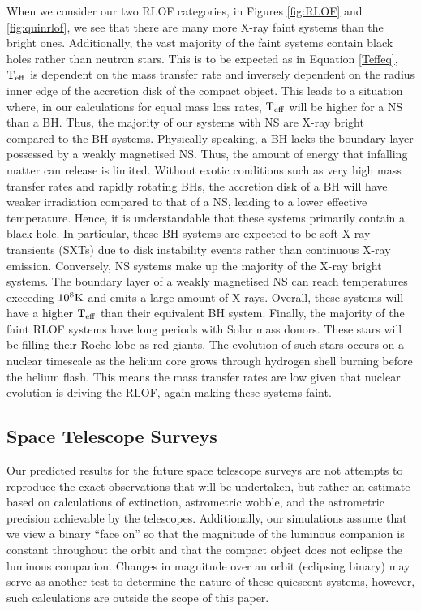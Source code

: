 \documentclass{pas}
\begin{document}
When we consider our two RLOF categories, in Figures \ref{fig:RLOF} and \ref{fig:quinrlof}, we see that there are many more X-ray faint systems than the bright ones. Additionally, the vast majority of the faint systems contain black holes rather than neutron stars. This is to be expected as in Equation \ref{Teffeq}, $\rm{T_{eff}}$ is dependent on the mass transfer rate and inversely dependent on the radius inner edge of the accretion disk of the compact object. This leads to a situation where, in our calculations for equal mass loss rates, $\rm{T_{eff}}$ will be higher for a NS than a BH. Thus, the majority of our systems with NS are X-ray bright compared to the BH systems. Physically speaking, a BH lacks the boundary layer possessed by a weakly magnetised NS. Thus, the amount of energy that infalling matter can release is limited. Without exotic conditions such as very high mass transfer rates and rapidly rotating BHs, the accretion disk of a BH will have weaker irradiation compared to that of a NS, leading to a lower effective temperature. Hence, it is understandable that these systems primarily contain a black hole. In particular, these BH systems are expected to be soft X-ray transients (SXTs) due to disk instability events rather than continuous X-ray emission. Conversely, NS systems make up the majority of the X-ray bright systems. The boundary layer of a weakly magnetised NS can reach temperatures exceeding $10^8\rm{K}$ and emits a large amount of X-rays. \citep{2001ApJ...547..355P} Overall, these systems will have a higher $\rm{T_{eff}}$ than their equivalent BH system. Finally, the majority of the faint RLOF systems have long periods with Solar mass donors. These stars will be filling their Roche lobe as red giants. The evolution of such stars occurs on a nuclear timescale as the helium core grows through hydrogen shell burning before the helium flash. This means the mass transfer rates are low given that nuclear evolution is driving the RLOF, again making these systems faint.



\subsection{Space Telescope Surveys}\label{STSec}

Our predicted results for the future space telescope surveys are not attempts to reproduce the exact observations that will be undertaken, but rather an estimate based on calculations of extinction, astrometric wobble, and the astrometric precision achievable by the telescopes. Additionally, our simulations assume that we view a binary ``face on'' so that the magnitude of the luminous companion is constant throughout the orbit and that the compact object does not eclipse the luminous companion. Changes in magnitude over an orbit (eclipsing binary) may serve as another test to determine the nature of these quiescent systems, however, such calculations are outside the scope of this paper. 
\end{document}
